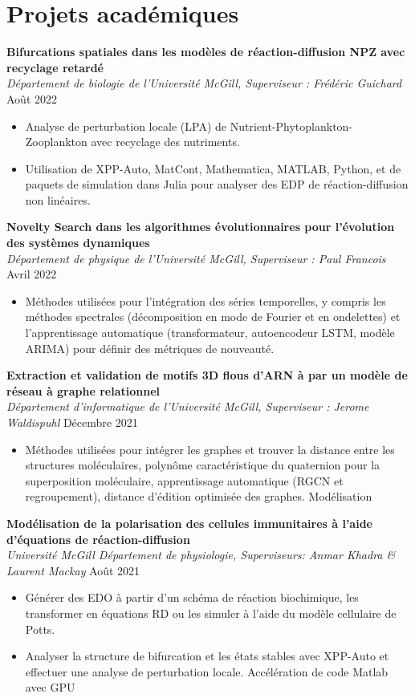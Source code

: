 \documentclass{article}
\newcommand{\cvsection}[1]{\section*{\rmfamily#1}}
\begin{document}
\cvsection{Projets académiques}
\indent

\textbf{Bifurcations spatiales dans les modèles de réaction-diffusion NPZ avec recyclage retardé}\\
\indent
\textit{Département de biologie de l'Université McGill, Superviseur : Frédéric Guichard} \hfill Août 2022
\begin{itemize}
    \item[] Analyse de perturbation locale (LPA) de Nutrient-Phytoplankton-Zooplankton avec recyclage des nutriments.
    \item[] Utilisation de XPP-Auto, MatCont, Mathematica, MATLAB, Python, et de paquets de simulation dans Julia pour analyser des EDP de réaction-diffusion non linéaires.
\end{itemize}

\textbf{Novelty Search dans les algorithmes évolutionnaires pour l'évolution des systèmes dynamiques}\\
\indent
\textit{Département de physique de l'Université McGill, Superviseur : Paul Francois} \hfill Avril 2022
\begin{itemize}
    \item[] Méthodes utilisées pour l'intégration des séries temporelles, y compris les méthodes spectrales (décomposition en mode de Fourier et en ondelettes) et l'apprentissage automatique (transformateur, autoencodeur LSTM, modèle ARIMA) pour définir des métriques de nouveauté.
\end{itemize}

\textbf{Extraction et validation de motifs 3D flous d'ARN à par un modèle de réseau à graphe relationnel}\\
\indent
\textit{Département d'informatique de l'Université McGill, Superviseur : Jerome Waldispuhl} \hfill Décembre 2021
\begin{itemize}
    \item[] Méthodes utilisées pour intégrer les graphes et trouver la distance entre les structures moléculaires, polynôme caractéristique du quaternion pour la superposition moléculaire, apprentissage automatique (RGCN et regroupement), distance d'édition optimisée des graphes.
Modélisation
\end{itemize}

\textbf{Modélisation de la polarisation des cellules immunitaires à l'aide d'équations de réaction-diffusion}\\
\indent
\textit{Université McGill Département de physiologie, Superviseurs: Anmar Khadra \& Laurent Mackay} \hfill Août 2021
\begin{itemize}
    \item[] Générer des EDO à partir d'un schéma de réaction biochimique, les transformer en équations RD ou les simuler à l'aide du modèle cellulaire de Potts.
    \item[] Analyser la structure de bifurcation et les états stables avec XPP-Auto et effectuer une analyse de perturbation locale. Accélération de code Matlab avec GPU
\end{itemize}
\end{document}
